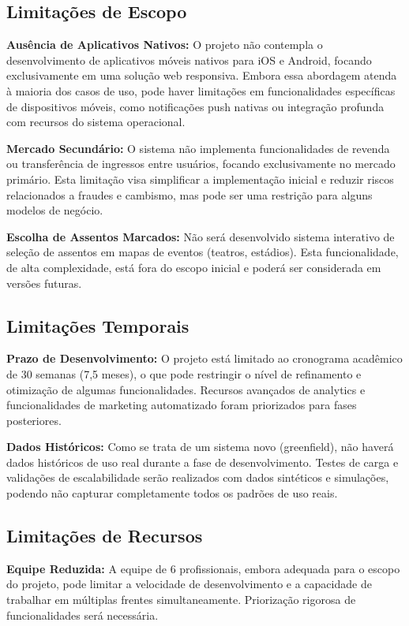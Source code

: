 \subsection{Limitações de Escopo}

\textbf{Ausência de Aplicativos Nativos:} O projeto não contempla o desenvolvimento de aplicativos móveis nativos para iOS e Android, focando exclusivamente em uma solução web responsiva. Embora essa abordagem atenda à maioria dos casos de uso, pode haver limitações em funcionalidades específicas de dispositivos móveis, como notificações push nativas ou integração profunda com recursos do sistema operacional.

\textbf{Mercado Secundário:} O sistema não implementa funcionalidades de revenda ou transferência de ingressos entre usuários, focando exclusivamente no mercado primário. Esta limitação visa simplificar a implementação inicial e reduzir riscos relacionados a fraudes e cambismo, mas pode ser uma restrição para alguns modelos de negócio.

\textbf{Escolha de Assentos Marcados:} Não será desenvolvido sistema interativo de seleção de assentos em mapas de eventos (teatros, estádios). Esta funcionalidade, de alta complexidade, está fora do escopo inicial e poderá ser considerada em versões futuras.

\subsection{Limitações Temporais}

\textbf{Prazo de Desenvolvimento:} O projeto está limitado ao cronograma acadêmico de 30 semanas (7,5 meses), o que pode restringir o nível de refinamento e otimização de algumas funcionalidades. Recursos avançados de analytics e funcionalidades de marketing automatizado foram priorizados para fases posteriores.

\textbf{Dados Históricos:} Como se trata de um sistema novo (greenfield), não haverá dados históricos de uso real durante a fase de desenvolvimento. Testes de carga e validações de escalabilidade serão realizados com dados sintéticos e simulações, podendo não capturar completamente todos os padrões de uso reais.

\subsection{Limitações de Recursos}

\textbf{Equipe Reduzida:} A equipe de 6 profissionais, embora adequada para o escopo do projeto, pode limitar a velocidade de desenvolvimento e a capacidade de trabalhar em múltiplas frentes simultaneamente. Priorização rigorosa de funcionalidades será necessária.

